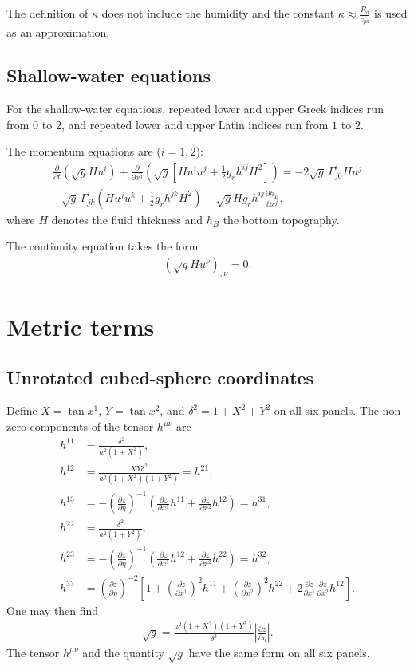\documentclass{article}
\begin{document}
The definition of $\kappa$ does not include the humidity and the constant $\kappa \approx \frac{R_d}{c_{pd}}$ is used as an approximation.

\subsection{Shallow-water equations}
For the shallow-water equations, repeated lower and upper Greek indices run from $0$ to $2$, and repeated lower and upper Latin indices run from $1$ to $2$.

The momentum equations are ($i=1,2$):
\begin{align}
\frac{\partial}{\partial t} \left( \sqrt{g}Hu^i \right)+\frac{\partial}{\partial x^j} \left( \sqrt{g}\left[Hu^i u^j +\frac{1}{2}g_rh^{ij}H^2\right]\right) =- 2\sqrt{g}\,\Gamma^i_{j0}Hu^j \nonumber \\
-\sqrt{g}\,\Gamma^i_{jk} \left( Hu^ju^k +\frac{1}{2}g_rh^{jk}H^2  \right) -\sqrt{g}Hg_rh^{ij}\frac{\partial h_B}{\partial x^j},
\end{align}
where $H$ denotes the fluid thickness and $h_B$ the bottom topography.

The continuity equation takes the form
\begin{align}
\left( \sqrt{g} H u^\nu \right)_{,\nu} = 0.
\end{align}

\section{Metric terms}
\subsection{Unrotated cubed-sphere coordinates}
Define $X=\tan x^1$, $Y=\tan x^2$, and $\delta^2=1+X^2+Y^2$ on all six panels. The non-zero components of the tensor $h^{\mu \nu}$ are
\begin{align}
h^{11}&=\frac{\delta^2}{a^2(1+X^2)}, \\
h^{12}&=\frac{XY\delta^2}{a^2(1+X^2)(1+Y^2)}=h^{21}, \\
h^{13}&=-\left( \frac{\partial z}{\partial \eta} \right)^{-1} \left( \frac{\partial z}{\partial x^1} h^{11} + \frac{\partial z}{\partial x^2} h^{12} \right)=h^{31}, \\
h^{22}&=\frac{\delta^2}{a^2(1+Y^2)}, \\
h^{23}&=-\left( \frac{\partial z}{\partial \eta} \right)^{-1} \left( \frac{\partial z}{\partial x^1} h^{12} + \frac{\partial z}{\partial x^2} h^{22} \right)=h^{32}, \\
h^{33}&=\left( \frac{\partial z}{\partial \eta} \right)^{-2} \left[ 1 + \left( \frac{\partial z}{\partial x^1} \right)^2 h^{11} + \left( \frac{\partial z}{\partial x^2} \right)^2 h^{22} +2\frac{\partial z}{\partial x^1} \frac{\partial z}{\partial x^2} h^{12}\right].
\end{align}
One may then find
\begin{align}
\sqrt{g}=\frac{a^2 (1+X^2)(1+Y^2)}{\delta^3}\left|\frac{\partial z}{\partial\eta}\right|. \label{rgt}
\end{align}
The tensor $h^{\mu\nu}$ and the quantity $\sqrt{g}$ have the same form on all six panels.
\end{document}
